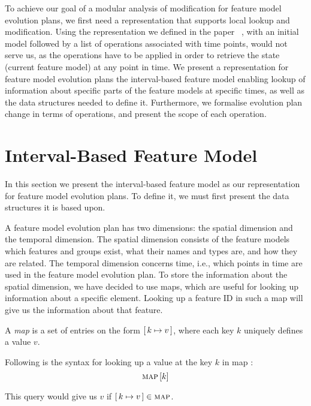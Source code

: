 To achieve our goal of a modular analysis of modification for feature model evolution plans, we first need a representation that supports local lookup and modification. Using the representation we defined in the paper~\cite{art:consistency-preserving-evolution-planning} , with an initial model followed by a list of operations associated with time points, would not serve us, as the operations have to be applied in order to retrieve the state (current feature model) at any point in time. We present a representation for feature model evolution plans \textemdash{} the interval-based feature model \textemdash{} enabling lookup of information about specific parts of the feature models at specific times, as well as the data structures needed to define it. Furthermore, we formalise evolution plan change in terms of operations, and present the scope of each operation. 

\section{Interval-Based Feature Model}
\label{sec:interval-based-feature-model}
In this section we present the interval-based feature model as our representation for feature model evolution plans. To define it, we must first present the data structures it is based upon.

A feature model evolution plan has two dimensions: the spatial dimension and the temporal dimension. The spatial dimension consists of the feature models \textemdash{} which features and groups exist, what their names and types are, and how they are related. The temporal dimension concerns time, i.e., which points in time are used in the feature model evolution plan. To store the information about the spatial dimension, we have decided to use maps, which are useful for looking up information about a specific element. Looking up a feature ID in such a map will give us the information about that feature. 
\\

\begin{definition}[Map]
  A \emph{map} is a set of entries on the form $[ \,k \mapsto v\, ]$, where each key $k$ uniquely defines a value $v$. 
  \label{def:map}
\end{definition}

Following is the syntax for looking up a value at the key $k$ in map :
\[
  \textsc{map} \left[ k \right]
\]

This query would give us $v$ if $[ \,k \mapsto v\, ] \in \textsc{map}$.

